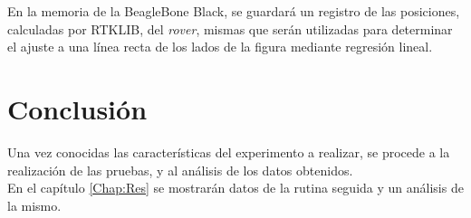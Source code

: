 En la memoria de la BeagleBone Black, se guardará un registro de las posiciones, calculadas por RTKLIB, del \textit{rover}, mismas que serán utilizadas para determinar el ajuste a una línea recta de los lados de la figura mediante regresión lineal.

\section{Conclusión}

Una vez conocidas las características del experimento a realizar, se procede a la realización de las pruebas, y al análisis de los datos obtenidos.\\

En el capítulo \ref{Chap:Res} se mostrarán datos de la rutina seguida y un análisis de la mismo.
